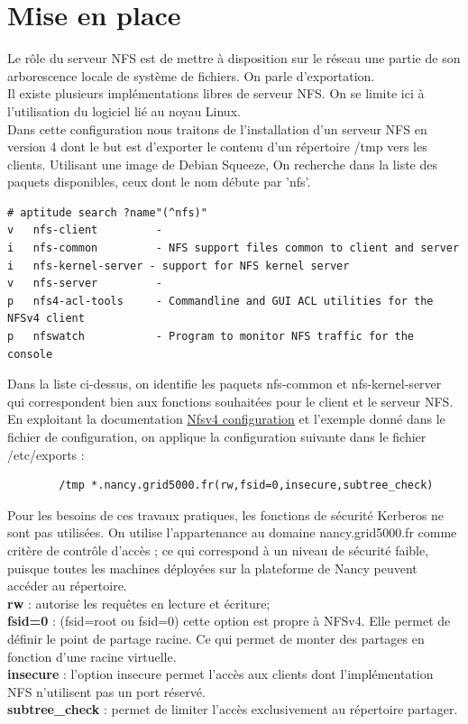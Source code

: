 \documentclass[12pt]{report}
\begin{document}
    \section{Mise en place}
Le rôle du serveur NFS est de mettre à disposition sur le réseau une partie de son arborescence locale de système de fichiers. On parle d'\og exportation\fg.\\
Il existe plusieurs implémentations libres de serveur NFS. On se limite ici à l'utilisation du logiciel lié au noyau Linux.\\
Dans cette configuration nous traitons de l'installation d'un serveur NFS en version 4 dont le but est d'exporter le contenu d'un répertoire /tmp vers les clients.
Utilisant une image de Debian Squeeze, On recherche dans la liste des paquets disponibles, ceux dont le nom débute par 'nfs'.
\begin{lstlisting}
# aptitude search ?name"(^nfs)"
v   nfs-client         -
i   nfs-common         - NFS support files common to client and server
i   nfs-kernel-server - support for NFS kernel server
v   nfs-server         -
p   nfs4-acl-tools     - Commandline and GUI ACL utilities for the NFSv4 client
p   nfswatch           - Program to monitor NFS traffic for the console
	  \end{lstlisting}
Dans la liste ci-dessus, on identifie les paquets nfs-common et nfs-kernel-server qui correspondent bien aux fonctions souhaitées pour le client et le serveur NFS.
En exploitant la documentation \href{https://wiki.linux-nfs.org/wiki/index.php/Nfsv4_configuration_fr}{Nfsv4 configuration} et l'exemple donné dans le fichier de configuration, on applique la configuration suivante dans le fichier /etc/exports :
    \begin{lstlisting}
	    /tmp *.nancy.grid5000.fr(rw,fsid=0,insecure,subtree_check)
	  \end{lstlisting}
Pour les besoins de ces travaux pratiques, les fonctions de sécurité Kerberos ne sont pas utilisées. On utilise l'appartenance au domaine nancy.grid5000.fr comme critère de contrôle d'accès ; ce qui correspond à un niveau de sécurité faible, puisque toutes les machines déployées sur la plateforme de Nancy peuvent accéder au répertoire.\\
	  \textbf{rw }: autorise les requêtes en lecture et écriture;\\
	  \textbf{fsid=0} : (fsid=root ou fsid=0) cette option est propre à NFSv4. Elle permet de définir le point de partage racine. Ce qui permet de monter des partages en fonction d'une racine virtuelle.\\
	  \textbf{insecure} : l'option insecure permet l'accès aux clients dont l'implémentation NFS n'utilisent pas un port réservé.\\
	  \textbf{subtree\_check} : permet de limiter l'accès exclusivement au répertoire partager.\\
	  
\end{document}
